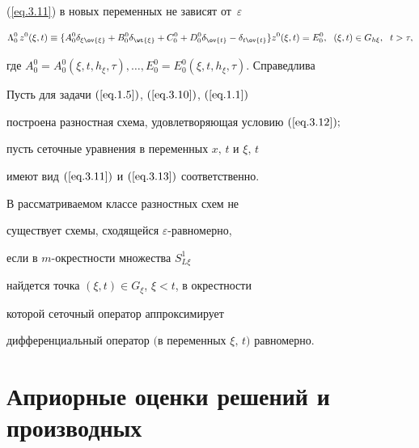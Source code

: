 (\ref{eq.3.11}) в новых переменных не зависят от~$\varepsilon$


\begin{equation}


\label{eq.3.13}


\Lambda^0_0\, z^0(\xi, t)\equiv \{A^0_0 \delta_{\xi\ov{\xi}}+B^0_0


\delta_{\wt{\xi}}+C^0_0+D^0_0


\delta_{\ov{t}}-\delta_{t\ov{t}}\} z^0(\xi, t)=E^0_0,


\ \; (\xi, t)\in G_{h \xi}, \ \; t> \tau,


\end{equation}


где $A^0_0=A^0_0(\xi, t, h_\xi, \tau), \dotsc, E^0_0=E^0_0(\xi, t,


h_\xi, \tau)$. Справедлива





\begin{thms}\label{t3.2}


Пусть для задачи $(\ref{eq.1.5})$, $(\ref{eq.3.10})$, $(\ref{eq.1.1})$


построена разностная схема, удовлетворяющая условию $(\ref{eq.3.12});$


пусть сеточные уравнения в переменных $x,\,t$ и $\xi,\,t$


имеют вид $(\ref{eq.3.11})$ и $(\ref{eq.3.13})$ соответственно.


В рассматриваемом классе разностных схем не


существует схемы, сходящейся $\varepsilon$-равномерно,


если в $m$-окрестности множества $S^1_{L\xi}$


найдется точка $(\xi,t)\in G_\xi$, $\xi<t$, в окрестности


которой сеточный оператор аппроксимирует


дифференциальный оператор $($в переменных $\xi,\,t)$ равномерно.


\end{thms}





\section{Априорные оценки решений и производных}


\label{section.4}





